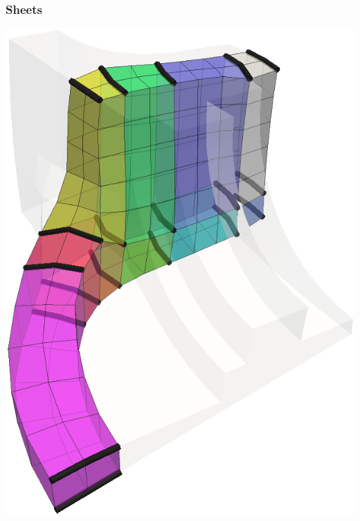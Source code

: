 \documentclass[12pt]{beamer}
\begin{document}
\begin{frame}[fragile]
  \frametitle{Sheets}
  \begin{center}
    \includegraphics[height=0.8\textheight]{./images/ex2-sheet1.png}
  \end{center}
\end{frame}
\end{document}
